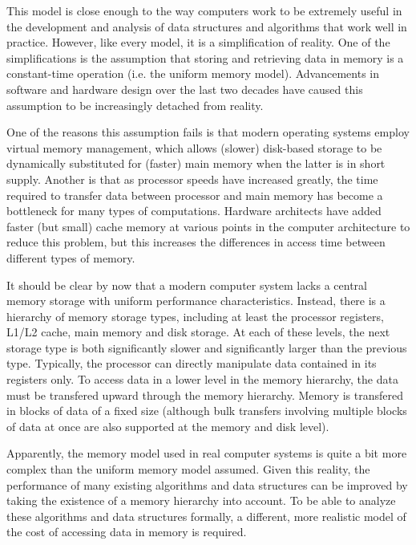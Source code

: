 \documentclass{acm_proc_article-sp}
\begin{document}
This model is close enough to the way computers work to be extremely useful in the development and analysis of data structures and algorithms that work well in practice. However, like every model, it is a simplification of reality. One of the simplifications is the assumption that storing and retrieving data in memory is a constant-time operation (i.e. the uniform memory model). Advancements in software and hardware design over the last two decades have caused this assumption to be increasingly detached from reality.

One of the reasons this assumption fails is that modern operating systems employ virtual memory management, which allows (slower) disk-based storage to be dynamically substituted for (faster) main memory when the latter is in short supply. Another is that as processor speeds have increased greatly, the time required to transfer data between processor and main memory has become a bottleneck for many types of computations. Hardware architects have added faster (but small) cache memory at various points in the computer architecture to reduce this problem, but this increases the differences in access time between different types of memory.

It should be clear by now that a modern computer system lacks a central memory storage with uniform performance characteristics. Instead, there is a hierarchy of memory storage types, including at least the processor registers, L1/L2 cache, main memory and disk storage. At each of these levels, the next storage type is both significantly slower and significantly larger than the previous type. Typically, the processor can directly manipulate data contained in its registers only. To access data in a lower level in the memory hierarchy, the data must be transfered upward through the memory hierarchy. Memory is transfered in blocks of data of a fixed size (although bulk transfers involving multiple blocks of data at once are also supported at the memory and disk level).


Apparently, the memory model used in real computer systems is quite a bit more complex than the uniform memory model assumed. Given this reality, the performance of many existing algorithms and data structures can be improved by taking the existence of a memory hierarchy into account. To be able to analyze these algorithms and data structures formally, a different, more realistic model of the cost of accessing data in memory is required.
\end{document}
